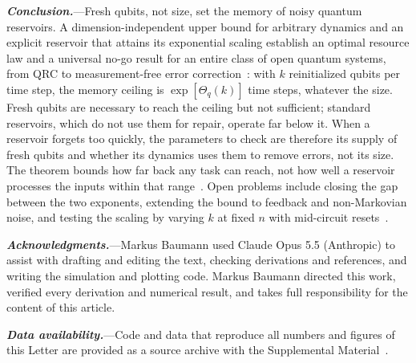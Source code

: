 \documentclass[aps,prl,twocolumn,superscriptaddress,floatfix]{revtex4-2}
\theoremstyle{plain}
\newcommand{\runin}[1]{\textit{\textbf{#1}}---}
\begin{document}
\runin{Conclusion.}Fresh qubits, not size, set the memory of noisy quantum reservoirs. A dimension-independent upper bound for arbitrary dynamics and an explicit reservoir that attains its exponential scaling establish an optimal resource law and a universal no-go result for an entire class of open quantum systems, from QRC to measurement-free error correction~\cite{Heussen2024}: with $k$ reinitialized qubits per time step, the memory ceiling is $\exp[\Theta_q(k)]$ time steps, whatever the size. Fresh qubits are necessary to reach the ceiling but not sufficient; standard reservoirs, which do not use them for repair, operate far below it. When a reservoir forgets too quickly, the parameters to check are therefore its supply of fresh qubits and whether its dynamics uses them to remove errors, not its size. The theorem bounds how far back any task can reach, not how well a reservoir processes the inputs within that range~\cite{Cao2026}. Open problems include closing the gap between the two exponents, extending the bound to feedback and non-Markovian noise, and testing the scaling by varying $k$ at fixed $n$ with mid-circuit resets~\cite{Yasuda2023,Hu2024}.

\begin{acknowledgments}
\runin{Acknowledgments.}Markus Baumann used Claude Opus 5.5 (Anthropic) to assist with drafting and editing the text, checking derivations and references, and writing the simulation and plotting code. Markus Baumann directed this work, verified every derivation and numerical result, and takes full responsibility for the content of this article.
\end{acknowledgments}

\runin{Data availability.}Code and data that reproduce all numbers and figures of this Letter are provided as a source archive with the Supplemental Material~\cite{SM}.


\end{document}
